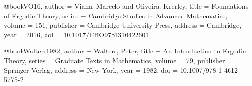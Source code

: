 @book{VO16,
  author    = {Viana, Marcelo and Oliveira, Krerley},
  title     = {Foundations of Ergodic Theory},
  series    = {Cambridge Studies in Advanced Mathematics},
  volume    = {151},
  publisher = {Cambridge University Press},
  address   = {Cambridge},
  year      = {2016},
  doi       = {10.1017/CBO9781316422601}
}

@book{Walters1982,
  author    = {Walters, Peter},
  title     = {An Introduction to Ergodic Theory},
  series    = {Graduate Texts in Mathematics},
  volume    = {79},
  publisher = {Springer-Verlag},
  address   = {New York},
  year      = {1982},
  doi       = {10.1007/978-1-4612-5775-2}
}
